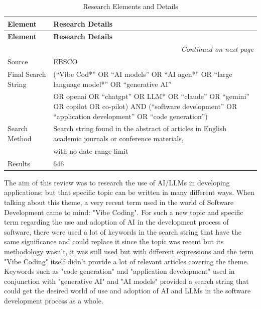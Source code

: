 {\small
\centering
\label{tab:RQs}

\begin{longtable}{p{2.8cm} p{12.2cm}}
\caption{Research Elements and Details} \\
\toprule
\textbf{Element} & \textbf{Research Details} \\
\midrule
\endfirsthead

\toprule
\textbf{Element} & \textbf{Research Details} \\
\midrule
\endhead

\midrule
\multicolumn{2}{r}{\textit{Continued on next page}} \\
\midrule
\endfoot

\bottomrule
\endlastfoot

Source & EBSCO \\

Final Search String &
(``Vibe Cod*'' OR ``AI models'' OR ``AI agen*'' OR ``large language model*'' OR ``generative AI'' \\
 & OR openai OR ``chatgpt'' OR LLM* OR ``claude'' OR ``gemini'' OR copilot OR co-pilot) AND (``software development'' OR ``application development'' OR ``code generation'') \\

Search Method & Search string found in the abstract of articles in English academic journals or conference materials, \\
 & with no date range limit \\

Results & 646 \\

\end{longtable}
}


The aim of this review was to research the use of AI/LLMs in developing applications; but that specific topic can be written in many different ways. When talking about this theme, a very recent term used in the world of Software Development came to mind: "Vibe Coding". For such a new topic and specific term regarding the use and adoption of AI in the development process of software, there were used a lot of keywords in the search string that have the same significance and could replace it since the topic was recent but its methodology wasn't, it was still used but with different expressions and the term "Vibe Coding" itself didn't provide a lot of relevant articles covering the theme. Keywords such as "code generation" and "application development" used in conjunction with "generative AI" and "AI models" provided a search string that could get the desired world of use and adoption of AI and LLMs in the software development process as a whole.

